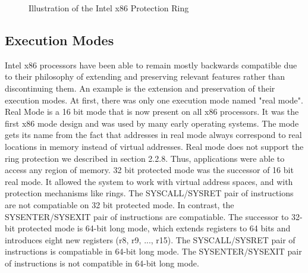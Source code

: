 \documentclass{report}
\begin{document}
\begin{spacing}{1.5}
{\begin{figure}[ht]
\begin{center}
\end{center}
\caption{Illustration of the Intel x86 Protection Ring}
\end{figure}
}
















\subsection{Execution Modes}

{\large
Intel x86 processors have been able to remain mostly backwards compatible due to their philosophy of extending and preserving relevant features rather than discontinuing them. An example is the extension and preservation of their execution modes. At first, there was only one execution mode named "real mode". Real Mode is a 16 bit mode that is now present on all x86 processors. It was the first x86 mode design and was used by many early operating systems. The mode gets its name from the fact that addresses in real mode always correspond to real locations in memory instead of virtual addresses. Real mode does not support the ring protection we described in section 2.2.8. Thus, applications were able to access any region of memory. 32 bit protected mode was the successor of 16 bit real mode. It allowed the system to work with virtual address spaces, and with protection mechanisms like rings. The SYSCALL/SYSRET pair of instructions are not compatiable on 32 bit protected mode. In contrast, the SYSENTER/SYSEXIT pair of instructions are compatiable. The successor to 32-bit protected mode is 64-bit long mode, which extends registers to 64 bits and introduces eight new registers (r8, r9, ..., r15). The SYSCALL/SYSRET pair of instructions is compatiable in 64-bit long mode. The SYSENTER/SYSEXIT pair of instructions is not compatible in 64-bit long mode.
\newline
}



\end{spacing}
\end{document}
